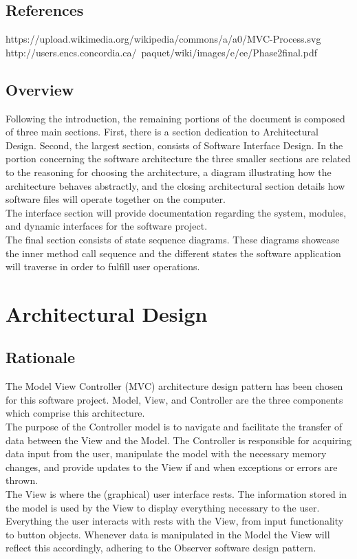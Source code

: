 \documentclass{scrreprt}
\begin{document}
\section{References}
https://upload.wikimedia.org/wikipedia/commons/a/a0/MVC-Process.svg \\
http://users.encs.concordia.ca/~paquet/wiki/images/e/ee/Phase2final.pdf
\section{Overview}
Following the introduction, the remaining portions of the document is composed of three main sections. First, there is a section dedication to Architectural Design. Second, the largest section, consists of Software Interface Design. In the portion concerning the software architecture the three smaller sections are related to the reasoning for choosing the architecture, a diagram illustrating how the architecture behaves abstractly, and the closing architectural section details how software files will operate together on the computer. \\
The interface section will provide documentation regarding the system, modules, and dynamic interfaces for the software project. \\
The final section consists of state sequence diagrams. These diagrams showcase the inner method call sequence and the different states the software application will traverse in order to fulfill user operations.
\chapter{Architectural Design}
\section{Rationale}
The Model View Controller (MVC) architecture design pattern has been chosen for this software project. Model, View, and Controller are the three components which comprise this architecture. \\

The purpose of the Controller model is to navigate and facilitate the transfer of data between the View and the Model. The Controller is responsible for acquiring data input from the user, manipulate the model with the necessary memory changes, and provide updates to the View if and when exceptions or errors are thrown. \\

The View is where the (graphical) user interface rests. The information stored in the model is used by the View to display everything necessary to the user. Everything the user interacts with rests with the View, from input functionality to button objects. Whenever data is manipulated in the Model the View will reflect this accordingly, adhering to the Observer software design pattern. \\
\end{document}
